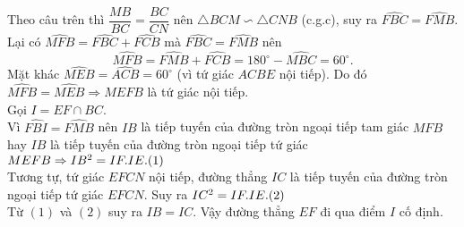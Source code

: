 \begin{bt}
{\begin{enumerate}
			Theo câu trên thì $\dfrac{MB}{BC}=\dfrac{BC}{CN}$ nên $\triangle BCM  \backsim \triangle CNB$ (c.g.c), suy ra $\widehat{FBC}=\widehat{FMB}$.\\
			Lại có $\widehat{MFB}=\widehat{FBC}+\widehat{FCB}$ mà $\widehat{FBC}=\widehat{FMB}$ nên 
			$$\widehat{MFB}=\widehat{FMB}+\widehat{FCB}=180^\circ - \widehat{MBC}=60^\circ.$$
			Mặt khác $\widehat{MEB}=\widehat{ACB}=60^\circ$ (vì tứ giác $ACBE$ nội tiếp). Do đó $\widehat{MFB}=\widehat{MEB}\Rightarrow MEFB$ là tứ giác nội tiếp.\\
			Gọi $I=EF \cap BC$.\\
			Vì $\widehat{FBI}=\widehat{FMB}$ nên $IB$ là tiếp tuyến của đường tròn ngoại tiếp tam giác $MFB$ hay $IB$ là tiếp tuyến của đường tròn ngoại tiếp tứ giác $MEFB \Rightarrow IB^2=IF.IE. \hfill (1)$\\
			Tương tự, tứ giác $EFCN$ nội tiếp, đường thẳng $IC$ là tiếp tuyến của đường tròn ngoại tiếp tứ giác $EFCN$. Suy ra $IC^2=IF.IE. \hfill (2)$\\
			Từ $(1)$ và $(2)$ suy ra $IB=IC$. Vậy đường thẳng $EF$ đi qua điểm $I$ cố định.
		\end{enumerate}
	}
\end{bt}


